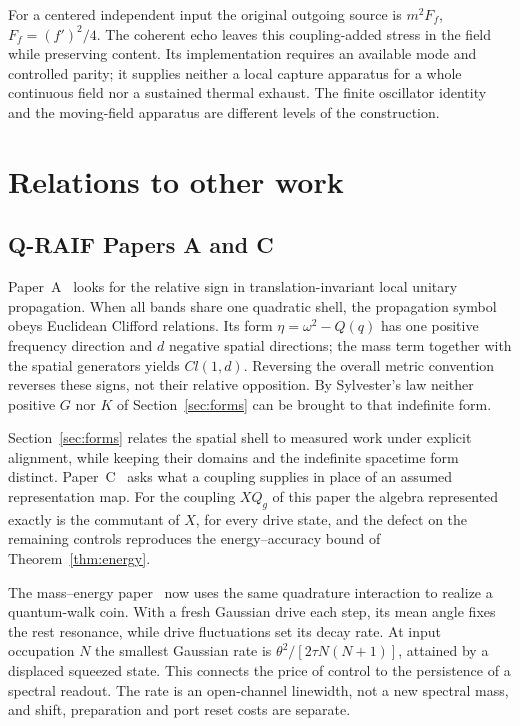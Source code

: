 \documentclass[aps,pre,onecolumn,superscriptaddress,floatfix,longbibliography]{revtex4-2}
\begin{document}
For a centered independent input the original outgoing source is $m^2F_f$,
$F_f=(f')^2/4$. The coherent echo leaves this coupling-added stress in the field
while preserving content. Its implementation requires an available mode and
controlled parity; it supplies neither a local capture apparatus for a whole
continuous field nor a sustained thermal exhaust. The finite oscillator identity
and the moving-field apparatus are different levels of the construction.

\section{Relations to other work}
\label{sec:context}

\subsection{Q-RAIF Papers A and C}

Paper~A~\cite{Liu2026QRAIF_A} looks for the relative sign in translation-invariant local unitary propagation. When all bands share one quadratic shell, the propagation symbol obeys Euclidean Clifford relations. Its form $\eta=\omega^2-Q(q)$ has one positive frequency direction and $d$ negative spatial directions; the mass term together with the spatial generators yields $Cl(1,d)$. Reversing the overall metric convention reverses these signs, not their relative opposition. By Sylvester's law neither positive $G$ nor $K$ of Section~\ref{sec:forms} can be brought to that indefinite form.

Section~\ref{sec:forms} relates the spatial shell to measured work under explicit alignment, while keeping their domains and the indefinite spacetime form distinct. Paper~C~\cite{Liu2026QRAIF_C} asks what a coupling supplies in place of an assumed representation map. For the coupling $XQ_g$ of this paper the algebra represented exactly is the commutant of $X$, for every drive state, and the defect on the remaining controls reproduces the energy--accuracy bound of Theorem~\ref{thm:energy}.

The mass--energy paper~\cite{Liu2026QRAIF_ME} now uses the same
quadrature interaction to realize a quantum-walk coin. With a fresh
Gaussian drive each step, its mean angle fixes the rest resonance,
while drive fluctuations set its decay rate. At input occupation $N$
the smallest Gaussian rate is $\theta^2/[2\tau N(N+1)]$, attained by
a displaced squeezed state. This connects the price of control to
the persistence of a spectral readout. The rate is an open-channel
linewidth, not a new spectral mass, and shift, preparation and port
reset costs are separate.
\end{document}
